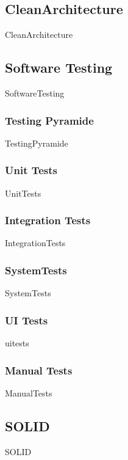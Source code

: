 \documentclass{article}
\begin{document}
    \subsection{CleanArchitecture}
        {CleanArchitecture}

    \subsection{Software Testing}
        {SoftwareTesting}

        \subsubsection{Testing Pyramide}
            {TestingPyramide}
        
        \subsubsection{Unit Tests}
            {UnitTests}
        
        \subsubsection{Integration Tests}
            {IntegrationTests}

        \subsubsection{SystemTests}
            {SystemTests}

        \subsubsection{UI Tests}
            {uitests}

        \subsubsection{Manual Tests}
            {ManualTests}

    \subsection{SOLID}
        {SOLID}
\end{document}
